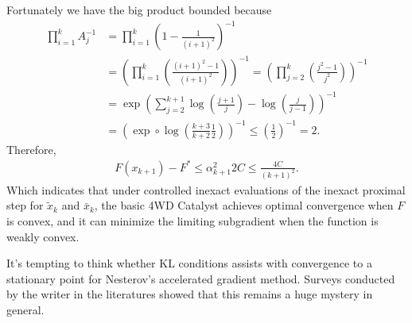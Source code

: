 \documentclass[12pt]{article}
\begin{document}
        Fortunately we have the big product bounded because 
        \begin{align*}
            \prod_{i = 1}^{k} A_{j}^{-1}
            &= 
            \prod_{i = 1}^{k} \left(
                1 - \frac{1}{(i + 1)^2}
            \right)^{-1}
            \\
            &= \left(
                \prod_{i = 1}^{k} \left( \frac{(i + 1)^2 - 1}{(i + 1)^2}\right)
            \right)^{-1} = 
            \left(
                \prod_{j = 2}^{k} 
                \left(
                    \frac{j^2 - 1}{j^2}
                \right)
            \right)^{-1}
            \\
            & = \exp\left(
                \sum_{j = 2}^{k + 1}
                \log\left(
                    \frac{j + 1}{j}
                \right) - \log\left(
                    \frac{j}{j - 1}
                \right)
            \right)^{-1}
            \\
            &= \left(\exp\circ \log
                \left(\frac{k + 3}{k + 2}\frac{1}{2}\right)\right)^{-1} 
            \le \left(
                \frac{1}{2}
            \right)^{-1}= 2. 
        \end{align*}
        Therefore, 
        \begin{align*}
            F(x_{k + 1}) - F^* \le \alpha_{k + 1}^2 2C\le \frac{4C}{(k + 1)^2}. 
        \end{align*}
        Which indicates that under controlled inexact evaluations of the inexact proximal step for $\tilde x_k$ and $\bar x_k$, the basic 4WD Catalyst achieves optimal convergence when $F$ is convex, and it can minimize the limiting subgradient when the function is weakly convex. 
        \begin{remark}
            It's tempting to think whether KL conditions assists with convergence to a stationary point for Nesterov's accelerated gradient method. 
            Surveys conducted by the writer in the literatures showed that this remains a huge mystery in general. 
        \end{remark}
\end{document}
